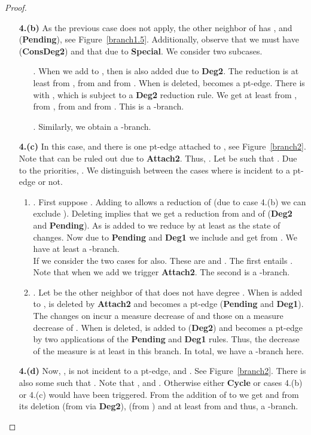 \documentclass{llncs}
\begin{document}
{{\begin{proof}
\begin{enumerate}
\item[\bf 4.(b)] As the previous case does not apply, the other neighbor  of  has , and  ({\bf Pending}), see Figure~\ref{branch1.5}. Additionally, observe that we must have  ({\bf ConsDeg2}) and that  due to {\bf Special}. We consider two subcases.
\begin{itemize}
\item[] . When we add  to , then  is also added due to {\bf Deg2}. The reduction is at least 
from , 
 from  and  from . When  is deleted,  becomes a pt-edge. There is  with ,
which is subject to a {\bf Deg2} reduction rule. We get at least  from ,  from ,  from  and
 from . This is a -branch. 
\item[] . Similarly, we obtain a -branch.
\end{itemize}
\item[\bf 4.(c)] In this case,  and there is one  pt-edge attached to , see Figure~\ref{branch2}. 
Note that  can be ruled out due to {\bf Attach2}. Thus, . Let  be such that . Due to the priorities, .  We distinguish between the cases where  is incident to a pt-edge or not.
\begin{enumerate}
 \item . First suppose . Adding  to  allows a reduction of  (due to case 4.(b) we can exclude
). Deleting  
implies that we get a reduction from  and  of  ({\bf Deg2} and {\bf Pending}). As  is added to  we reduce  by
at least  as the state of  changes. Now due to {\bf Pending} and {\bf Deg1} we include  and get  from . We have at least a -branch.\\
If  we consider the two cases for  also. These are  and . The first  entails .
 Note that when we add  we trigger {\bf Attach2}. The second is a -branch.
\item . Let  be the other neighbor of  that does not have degree . When  is added to ,  is deleted by
{\bf Attach2} and  becomes a pt-edge 
({\bf Pending} and {\bf Deg1}). The changes on  incur a measure decrease of  and those on  a measure decrease of .
When  is deleted,  is added to  ({\bf Deg2}) and  becomes a pt-edge by two applications of the {\bf Pending} and {\bf
Deg1} rules. Thus,
 the decrease of the measure is at least  in this branch. In total, we have a
-branch here.
\end{enumerate}
\item[\bf 4.(d)] Now, ,  is not incident to a pt-edge, and . See Figure~\ref{branch2}. There is also some  such that .
Note that ,  and . Otherwise either {\bf Cycle} or  cases 4.(b) or 4.(c) would have been triggered. 
From the addition of  to  we get  and from its deletion  (from  via {\bf Deg2}),  (from
) and at least  from  and thus, a -branch.


\end{enumerate}
\end{proof}}}
\end{document}

